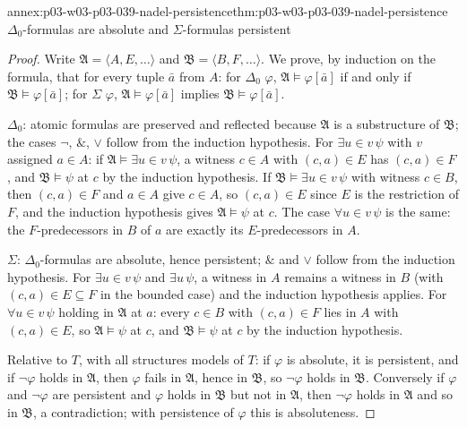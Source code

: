 \begin{annexitem}{annex:p03-w03-p03-039-nadel-persistence}{thm:p03-w03-p03-039-nadel-persistence}{\(\Delta_0\)-formulas are absolute and \(\Sigma\)-formulas persistent}
\begin{proof}
Write \(\mathfrak A=\langle A,E,\dots\rangle\) and
\(\mathfrak B=\langle B,F,\dots\rangle\). We prove, by induction on the
formula, that for every tuple \(\bar a\) from \(A\): for \(\Delta_0\)
\(\varphi\), \(\mathfrak A\models\varphi[\bar a]\) if and only if
\(\mathfrak B\models\varphi[\bar a]\); for \(\Sigma\) \(\varphi\),
\(\mathfrak A\models\varphi[\bar a]\) implies \(\mathfrak B\models\varphi[\bar a]\).

\(\Delta_0\): atomic formulas are preserved and reflected because
\(\mathfrak A\) is a substructure of \(\mathfrak B\); the cases \(\neg\),
\(\&\), \(\vee\) follow from the induction hypothesis. For
\(\exists u\in v\,\psi\) with \(v\) assigned \(a\in A\): if
\(\mathfrak A\models\exists u\in v\,\psi\), a witness \(c\in A\) with
\((c,a)\in E\) has \((c,a)\in F\), and \(\mathfrak B\models\psi\) at \(c\) by the
induction hypothesis. If \(\mathfrak B\models\exists u\in v\,\psi\) with
witness \(c\in B\), then \((c,a)\in F\) and \(a\in A\) give \(c\in A\), so
\((c,a)\in E\) since \(E\) is the restriction of \(F\), and the induction
hypothesis gives \(\mathfrak A\models\psi\) at \(c\). The case
\(\forall u\in v\,\psi\) is the same: the \(F\)-predecessors in \(B\) of \(a\)
are exactly its \(E\)-predecessors in \(A\).

\(\Sigma\): \(\Delta_0\)-formulas are absolute, hence persistent; \(\&\) and
\(\vee\) follow from the induction hypothesis. For \(\exists u\in v\,\psi\)
and \(\exists u\,\psi\), a witness in \(A\) remains a witness in \(B\)
(with \((c,a)\in E\subseteq F\) in the bounded case) and the induction
hypothesis applies. For \(\forall u\in v\,\psi\) holding in \(\mathfrak A\)
at \(a\): every \(c\in B\) with \((c,a)\in F\) lies in \(A\) with
\((c,a)\in E\), so \(\mathfrak A\models\psi\) at \(c\), and \(\mathfrak B\models\psi\)
at \(c\) by the induction hypothesis.

Relative to \(T\), with all structures models of \(T\): if \(\varphi\) is
absolute, it is persistent, and if \(\neg\varphi\) holds in \(\mathfrak A\),
then \(\varphi\) fails in \(\mathfrak A\), hence in \(\mathfrak B\), so
\(\neg\varphi\) holds in \(\mathfrak B\). Conversely if \(\varphi\) and
\(\neg\varphi\) are persistent and \(\varphi\) holds in \(\mathfrak B\) but
not in \(\mathfrak A\), then \(\neg\varphi\) holds in \(\mathfrak A\) and so in
\(\mathfrak B\), a contradiction; with persistence of \(\varphi\) this is
absoluteness.
\end{proof}
\end{annexitem}

